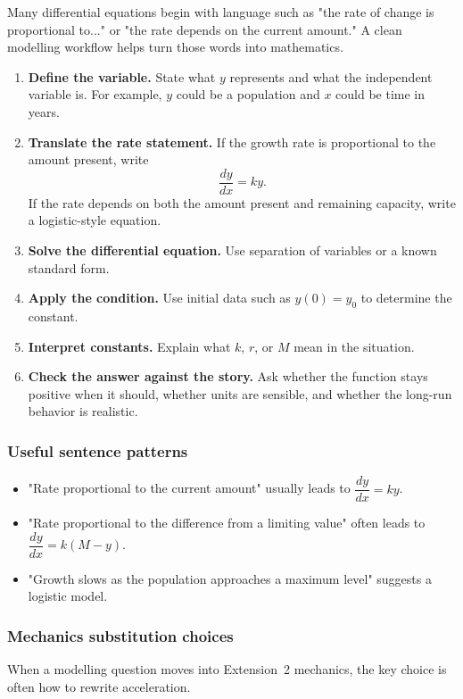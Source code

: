 Many differential equations begin with language such as "the rate of change is proportional to..." or "the rate depends on the current amount." A clean modelling workflow helps turn those words into mathematics.

\begin{enumerate}[leftmargin=*]
  \item \textbf{Define the variable.} State what $y$ represents and what the independent variable is. For example, $y$ could be a population and $x$ could be time in years.
  \item \textbf{Translate the rate statement.} If the growth rate is proportional to the amount present, write
  \[
  \frac{dy}{dx}=ky.
  \]
  If the rate depends on both the amount present and remaining capacity, write a logistic-style equation.
  \item \textbf{Solve the differential equation.} Use separation of variables or a known standard form.
  \item \textbf{Apply the condition.} Use initial data such as $y(0)=y_0$ to determine the constant.
  \item \textbf{Interpret constants.} Explain what $k$, $r$, or $M$ mean in the situation.
  \item \textbf{Check the answer against the story.} Ask whether the function stays positive when it should, whether units are sensible, and whether the long-run behavior is realistic.
\end{enumerate}

\subsubsection*{Useful sentence patterns}
\begin{itemize}[leftmargin=*]
  \item "Rate proportional to the current amount" usually leads to $\dfrac{dy}{dx}=ky$.
  \item "Rate proportional to the difference from a limiting value" often leads to $\dfrac{dy}{dx}=k(M-y)$.
  \item "Growth slows as the population approaches a maximum level" suggests a logistic model.
\end{itemize}

\subsubsection*{Mechanics substitution choices}
When a modelling question moves into Extension~2 mechanics, the key choice is often how to rewrite acceleration.

